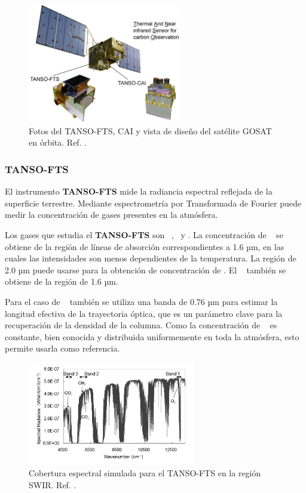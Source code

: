 \documentclass[11pt,titlepage]{article}
\begin{document}
    \begin{figure}[htb!]
    \centering
    \includegraphics[width=0.6\textwidth]{fig/GOSAT-TANSO.png}
    \caption{Fotos del TANSO-FTS, CAI y vista de diseño del satélite GOSAT en órbita. Ref. \cite{MissionGOSAT}.}
    \label{fig:GOSAT-TANSO}
\end{figure}


\subsubsection{TANSO-FTS}

El instrumento \textbf{TANSO-FTS} mide la radiancia espectral reflejada de la superficie terrestre. Mediante espectrometría por Transformada de Fourier puede medir la concentración de gases presentes en la atmósfera.\par
Los gases que estudia el \textbf{TANSO-FTS} son \oxygen~,\dioxcarb~ y \metano. La concentración de \oxygen~  se obtiene de la región de líneas de absorción correspondientes a 1.6 µm, en las cuales las intensidades son menos dependientes de la temperatura. La región de 2.0 µm puede usarse para la obtención de concentración de \dioxcarb. El \metano~ también se obtiene de la región de 1.6 µm.\par
Para el caso de \oxygen~ también se utiliza una banda de 0.76 µm para estimar la longitud efectiva de la trayectoria óptica, que es un parámetro clave para la recuperación de la densidad de la columna. Como la concentración de \oxygen~ es constante, bien conocida y distribuida uniformemente en toda la atmósfera, esto permite usarla como referencia. 

    \begin{figure}[htb!]
    \centering
    \includegraphics[width=0.65\textwidth]{fig/GosatSimulatedSpectra.png}
    \caption{Cobertura espectral simulada para el TANSO-FTS en la región SWIR. Ref. \cite{FTS-GOSAT}.}
    \label{fig:GosatSimulatedSpectra}
\end{figure}
\end{document}
